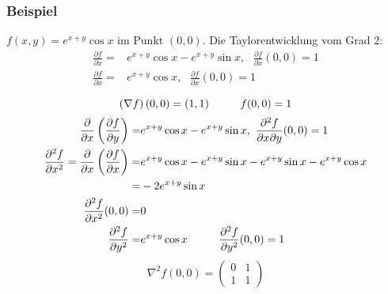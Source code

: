 \subsubsection*{Beispiel}
$f\left( x,y\right)=e^{x+y}\cos x$ im Punkt $(0,0)$. Die Taylorentwicklung vom Grad 2:
\begin{align*}
\frac{{\partial f}}{{\partial x}} = & {e^{x + y}}\cos x - {e^{x + y}}\sin x,\text{ }\frac{{\partial f}}{{\partial x}}(0,0) = 1\\
\frac{{\partial f}}{{\partial x}} =  & {e^{x + y}}\cos x ,\text{ }\frac{{\partial f}}{{\partial x}}(0,0) = 1\\
\end{align*}
\[\left( \nabla f\right)(0,0)=(1,1)\hspace{10mm}f(0,0)=1\]
\begin{align*}
\frac{\partial }{{\partial x}}\left( {\frac{{\partial f}}{{\partial y}}} \right) = & {e^{x + y}}\cos x - {e^{x + y}}\sin x,\text{ }\frac{{{\partial ^2}f}}{{\partial x\partial y}}(0,0) = 1\\
\frac{{\partial^2 f}}{{\partial x^2}} = \frac{\partial }{{\partial x}}\left( {\frac{{\partial f}}{{\partial x}}} \right) = & {e^{x + y}}\cos x - {e^{x + y}}\sin x - {e^{x + y}}\sin x - {e^{x + y}}\cos x\\
= & -2e^{x+y}\sin x\\
\frac{{{\partial ^2}f}}{{\partial {x^2}}}(0,0) = & 0\\
\frac{{{\partial ^2}f}}{{\partial {y^2}}} = & {e^{x + y}}\cos x\hspace{10mm}\frac{{{\partial ^2}f}}{{\partial {y^2}}}(0,0) = 1
\end{align*}
\[{\nabla ^2}f(0,0) = \left( {\begin{array}{*{20}{c}}
0&1\\
1&1
\end{array}} \right)\]

